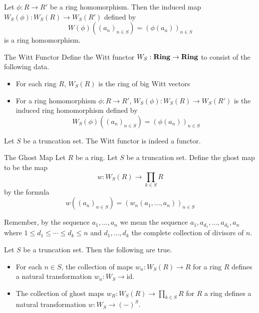 \documentclass[a4paper]{article}
\begin{document}
\begin{prp}{}{} Let $\phi:R\to R'$ be a ring homomorphism. Then the induced map $W_S(\phi):W_S(R)\to W_S(R')$ defined by $$W(\phi)((a_n)_{n\in S})=(\phi(a_n))_{n\in S}$$ is a ring homomorphism. 
\end{prp}

\begin{defn}{The Witt Functor}{} Define the Witt functor $W_S:\bold{Ring}\to\bold{Ring}$ to consist of the following data. 
\begin{itemize}
\item For each ring $R$, $W_S(R)$ is the ring of big Witt vectors
\item For a ring homomorphism $\phi:R\to R'$, $W_S(\phi):W_S(R)\to W_S(R')$ is the induced ring homomorphism defined by $$W_S(\phi)((a_n)_{n\in S})=(\phi(a_n))_{n\in S}$$
\end{itemize}
\end{defn}

\begin{prp}{}{} Let $S$ be a truncation set. The Witt functor is indeed a functor. 
\end{prp}

\begin{defn}{The Ghost Map}{} Let $R$ be a ring. Let $S$ be a truncation set. Define the ghost map to be the map $$w:W_S(R)\to\prod_{k\in S}R$$ by the formula $$w((a_n)_{n\in S})=(w_n(a_1,\dots,a_n))_{n\in S}$$
\end{defn}

Remember, by the sequence $a_1,\dots,a_n$ we mean the sequence $a_1,a_{d_1},\dots,a_{d_k},a_n$ where $1\leq d_1\leq\cdots\leq d_k\leq n$ and $d_1,\dots,d_k$ the complete collection of divisors of $n$. 

\begin{prp}{}{} Let $S$ be a truncation set. Then the following are true. 
\begin{itemize}
\item For each $n\in S$, the collection of maps $w_n:W_S(R)\to R$ for a ring $R$ defines a natural transformation $w_n:W_S\rightarrow\text{id}$. 
\item The collection of ghost maps $w_R:W_S(R)\to\prod_{k\in S}R$ for $R$ a ring defines a natural transformation $w:W_S\rightarrow (-)^S$. 
\end{itemize}
\end{prp}
\end{document}
